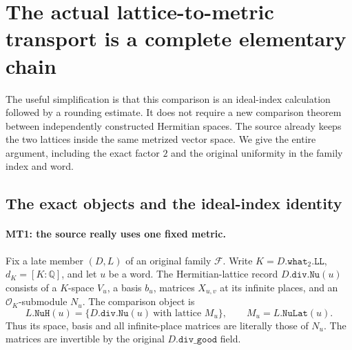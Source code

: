 \section{The actual lattice-to-metric transport is a complete elementary chain}
\label{sec:metric-transport-complete}


The useful simplification is that this comparison is an ideal-index
calculation followed by a rounding estimate.  It does not require a new
comparison theorem between independently constructed Hermitian spaces.
The source already keeps the two lattices inside the same metrized vector
space.  We give the entire argument, including the exact factor $2$ and
the original uniformity in the family index and word.

\subsection{The exact objects and the ideal-index identity}

\paragraph{MT1: the source really uses one fixed metric.}
\label{claim:MT1}
Fix a late member $(D,L)$ of an original family $\mathcal F$.  Write
$K=D.\texttt{what}_2.\texttt{LL}$, $d_K=[K:\mathbb Q]$, and let $u$
be a word.  The Hermitian-lattice record $D.\texttt{div.Nu}(u)$ consists
of a $K$-space $V_u$, a basis $b_u$, matrices $X_{u,v}$ at its infinite
places, and an $\mathcal O_K$-submodule $N_u$.  The comparison object is
\[
 L.\texttt{NuH}(u)=
       \{D.\texttt{div.Nu}(u)\ \text{with lattice }M_u\},
 \qquad M_u=L.\texttt{NuLat}(u).                         \tag{MT.1}
\]
Thus its space, basis and all infinite-place matrices are literally those
of $N_u$.  The matrices are invertible by the original
$D.\texttt{div\_good}$ field.

